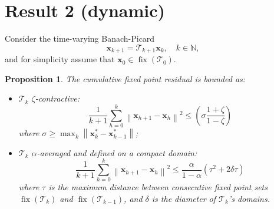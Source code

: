\documentclass[11pt,a4paper]{article}
\DeclareMathOperator{\fix}{fix}
\newcommand{\norm}[1]{\left\lVert#1\right\rVert}
\theoremstyle{plain} %
\newtheorem{proposition}[theorem]{Proposition}
\theoremstyle{definition} %
\theoremstyle{remark} %
\newcommand{\N}{\mathbb{N}}
\newcommand{\x}{\mathbold{x}}
\newcommand{\T}{\mathcal{T}}
\begin{document}
\section{Result 2 (dynamic)}
Consider the time-varying Banach-Picard
$$
	\x_{k+1} = \T_{k+1} \x_k, \quad k \in \N,
$$
and for simplicity assume that $\x_0 \in \fix(\T_0)$.

\begin{proposition}
The cumulative fixed point residual is bounded as:
\begin{itemize}
	\item \emph{$\T_k$ $\zeta$-contractive}:
	$$
		\frac{1}{k+1} \sum_{h = 0}^k \norm{\x_{h+1} - \x_h}^2 \leq \left( \sigma \frac{1 + \zeta}{1 - \zeta} \right)
	$$
	where $\sigma \geq \max_k \norm{\x_k^* - \x_{k-1}^*}$;
	
	\item \emph{$\T_k$ $\alpha$-averaged} and defined on a compact domain:
	$$
		\frac{1}{k+1} \sum_{h = 0}^k \norm{\x_{h+1} - \x_h}^2 \leq \frac{\alpha}{1 - \alpha} (\tau^2 + 2 \delta \tau)
	$$
	where $\tau$ is the maximum distance between consecutive fixed point sets $\fix(\T_k)$ and $\fix(\T_{k-1})$, and $\delta$ is the diameter of $\T_k$'s domains.
\end{itemize}
\end{proposition}
%
\end{document}
